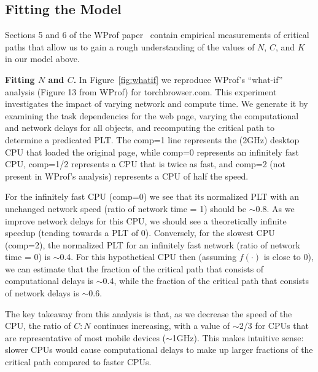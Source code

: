 \subsection{Fitting the Model}
\label{subsec:model_fitting}

Sections 5 and 6 of the WProf paper~\cite{wang2013demystifying} contain
empirical measurements of critical paths that allow us to gain a rough
understanding of the values of $N$, $C$, and $K$ in our model
above.

{\bf Fitting $N$ and $C$.} In Figure~\ref{fig:whatif} we reproduce WProf's
``what-if'' analysis (Figure 13 from WProf)
for torchbrowser.com. This experiment investigates the impact of varying network
and compute time. We generate it by examining the task dependencies for the
web page, varying the computational and network delays for all
objects, and recomputing the critical path to determine a predicated PLT. The
comp=1 line represents the (2GHz) desktop CPU that loaded the original page, while comp=0
represents an infinitely fast CPU, comp=1/2 represents a CPU that is twice as fast, and
comp=2 (not present in WProf's analysis) represents a CPU
of half the speed.

For the infinitely fast CPU (comp=0) we see that its normalized PLT with an unchanged
network speed (ratio of network time = 1) should be
{\footnotesize$\sim$}0.8. As we improve network delays for this CPU, we should
see a theoretically infinite speedup (tending towards a PLT of 0).
Conversely, for
the slowest CPU (comp=2), the normalized PLT for an infinitely fast network (ratio of
network time = 0) is {\footnotesize$\sim$}0.4. For this hypothetical CPU then (assuming $f(\cdot)$ is close
to 0), we can estimate that the fraction of the critical path that consists
of computational delays is {\footnotesize$\sim$}0.4, while the fraction of the
critical path that consists of network delays is {\footnotesize$\sim$}0.6.

The key takeaway from this analysis is that, as we decrease the speed of the
CPU, the ratio of $C:N$ continues increasing, with a value of
{\footnotesize$\sim$}2/3 for CPUs that are representative of most mobile
devices ({\footnotesize$\sim$}1GHz). This makes intuitive sense:
slower CPUs would cause computational delays to make up larger fractions of
the critical path compared to faster CPUs.

